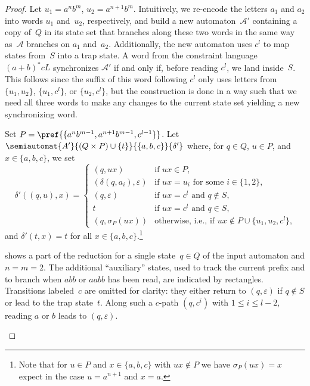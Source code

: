 \begin{proof}
	Let $u_1 = a^{n}b^{m}$, $u_2 = a^{n+1}b^{m}$.
	Intuitively, we re-encode the letters $a_1$ and $a_2$
	into words $u_1$ and~$u_2$, respectively, and build a new automaton~$\mathcal A'$
	containing a copy of~$Q$ in its state set 
	that branches along these two words in the same way as~$\mathcal A$
	branches on $a_1$ and~$a_2$.
	Additionally, the new automaton uses $c^l$
	to map states from~$S$ into a trap state.
	A word from the constraint language $(a+b)^*cL$
	synchronizes $\mathcal A'$
	if and only if, before reading $c^l$, we land
	inside~$S$. This follows since the suffix of this word following $c^l$ only uses letters
	from $\{u_1,u_2\}$, $\{u_1,c^l\}$, or $\{u_2,c^l\}$,
	but the construction is done in a way such that 
	we need all three words to make any changes to the current state set
	yielding a new synchronizing word.
	
	Set $P = \pref{\{a^n b^{m-1}, a^{n+1}b^{m-1}, c^{l-1} \}}$.
	Let $\semiautomat{A'}{ ( Q \times P ) \cup \{t\}}{\{a,b,c\}}{\delta'}$
	where, for $q \in Q$, $u \in P$,
	and $x \in \{a,b,c\}$, we set
	\[
	\delta'((q, u), x) =
	\begin{cases}
		(q, ux) & \text{if } ux \in P, \\
		(\delta(q, a_i), \varepsilon) & \text{if $ux = u_i$ for some $i \in \{1,2\}$,} \\	
		(q, \varepsilon) & \text{if $ux = c^l$ and $q \notin S$}, \\
		t                & \text{if $ux = c^l$ and $q \in S$},\\
		(q, \sigma_P(ux)) & \text{otherwise, i.e., if $ux \notin P \cup \{u_1, u_2, c^l\}$,}
	\end{cases}
	\]
	and $\delta'(t, x) = t$ for all $x \in \{a,b,c\}$.\footnote{Note that 
		for $u \in P$ and $x \in \{a,b,c\}$
		with $ux \notin P$
		we have $\sigma_P(ux) = x$ expect in the case $u = a^{n+1}$ and $x = a$.}

	 shows a part of the reduction
	for a single state~$q \in Q$ of the input automaton
	and $n = m = 2$.
	 The additional ``auxiliary'' states, used to track the current prefix and to branch when $abb$ or $aabb$ has been read, are indicated by rectangles. Transitions labeled~$c$ are omitted for clarity: they either return to $(q,\varepsilon)$ if $q \notin S$ or lead to the trap state~$t$. 
	 Along such a $c$-path $(q, c^i)$ with $1 \le i \le l-2$, 
	 reading $a$ or $b$ leads to $(q,\varepsilon)$.
	
		\begin{figure}[htb]
			\centering
\end{figure}
\end{proof}
